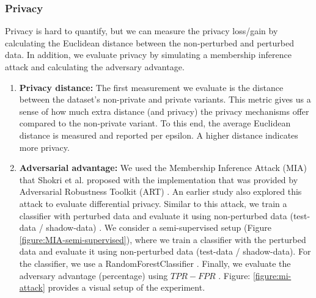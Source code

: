\subsubsection{Privacy}
Privacy is hard to quantify, but we can measure the privacy loss/gain by calculating the Euclidean distance between the non-perturbed and perturbed data.
In addition, we evaluate privacy by simulating a membership inference attack and calculating the adversary advantage.
\begin{enumerate}
      \item \textbf{Privacy distance: }
            The first measurement we evaluate is the distance between the dataset's non-private and private variants.
            This metric gives us a sense of how much extra distance (and privacy) the privacy mechanisms offer compared to the non-private variant.
            To this end, the average Euclidean distance is measured and reported per epsilon. A higher distance indicates more privacy.
      \item \textbf{Adversarial advantage: }
            We used the Membership Inference Attack (MIA) that Shokri et al. proposed with the implementation that was provided by Adversarial Robustness Toolkit (ART) \citep{nicolae_adversarial_2019}.
            An earlier study also explored this attack to evaluate differential privacy.
            Similar to this attack, we train a classifier with perturbed data and evaluate it using non-perturbed data (test-data / shadow-data) \citep{zhao_not_2020}.
            We consider a semi-supervised setup (Figure \ref{figure:MIA-semi-supervised}), where we train a classifier with the perturbed data and evaluate it using non-perturbed data (test-data / shadow-data).
            For the classifier, we use a RandomForestClassifier \citep{rigaki_survey_2021}.
            Finally, we evaluate the adversary advantage (percentage) using $TPR - FPR$ \citep{yeom_privacy_2018}.
            Figure: \ref{figure:mi-attack} provides a visual setup of the experiment.


\end{enumerate}
